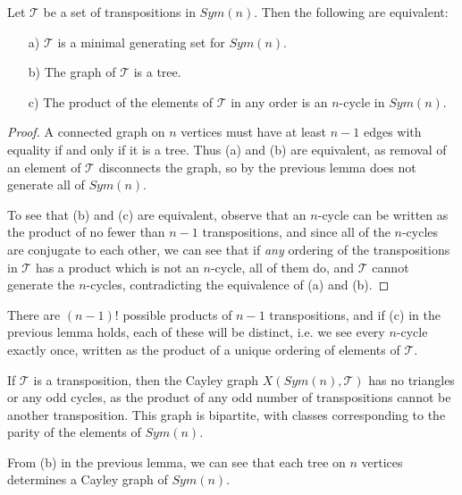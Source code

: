 \begin{lemma}
	Let $\mathcal{T}$ be a set of transpositions in $Sym(n)$.  Then the following are equivalent:
	\begin{enumerate}
		\item[a)] $\mathcal{T}$ is a minimal generating set for $Sym(n)$.
		\item[b)] The graph of $\mathcal{T}$ is a tree.
		\item[c)] The product of the elements of $\mathcal{T}$ in any order is an $n$-cycle in $Sym(n)$.
	\end{enumerate}
\end{lemma}
\begin{proof}
	A connected graph on $n$ vertices must have at least $n-1$ edges with equality if and only if it is a tree.  Thus (a) and (b) are equivalent, as removal of an element of $\mathcal{T}$ disconnects the graph, so by the previous lemma does not generate all of $Sym(n)$.
	
	To see that (b) and (c) are equivalent, observe that an $n$-cycle can be written as the product of no fewer than $n-1$ transpositions, and since all of the $n$-cycles are conjugate to each other, we can see that if \textit{any} ordering of the transpositions in $\mathcal{T}$ has a product which is not an $n$-cycle, all of them do, and $\mathcal{T}$ cannot generate the $n$-cycles, contradicting the equivalence of (a) and (b).
\end{proof}

There are $(n-1)!$ possible products of $n-1$ transpositions, and if (c) in the previous lemma holds, each of these will be distinct, i.e. we see every $n$-cycle exactly once, written as the product of a unique ordering of elements of $\mathcal{T}$.

If $\mathcal{T}$ is a transposition, then the Cayley graph $X(Sym(n),\mathcal{T})$ has no triangles or any odd cycles, as the product of any odd number of transpositions cannot be another transposition.  This graph is bipartite, with classes corresponding to the parity of the elements of $Sym(n)$.

From (b) in the previous lemma, we can see that each tree on $n$ vertices determines a Cayley graph of $Sym(n)$.



